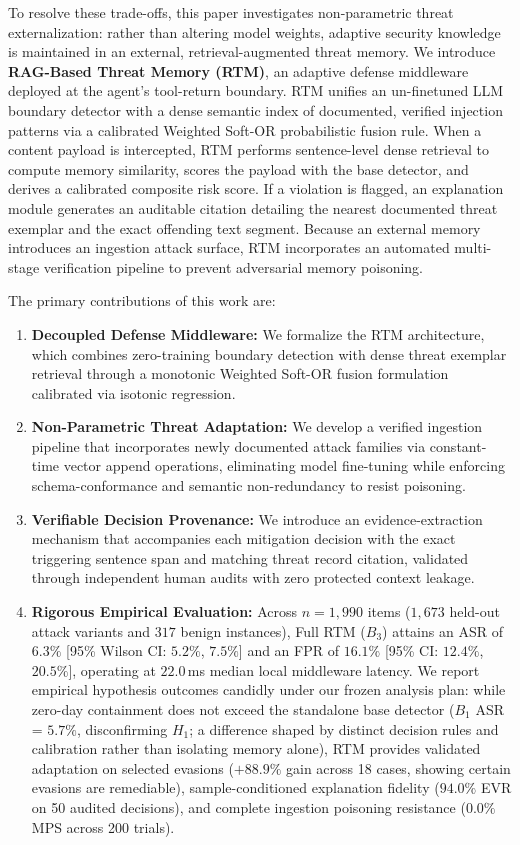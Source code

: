 \documentclass[conference]{IEEEtran}
\begin{document}
To resolve these trade-offs, this paper investigates non-parametric threat externalization: rather than altering model weights, adaptive security knowledge is maintained in an external, retrieval-augmented threat memory. We introduce \textbf{RAG-Based Threat Memory (RTM)}, an adaptive defense middleware deployed at the agent's tool-return boundary. RTM unifies an un-finetuned LLM boundary detector with a dense semantic index of documented, verified injection patterns via a calibrated Weighted Soft-OR probabilistic fusion rule. When a content payload is intercepted, RTM performs sentence-level dense retrieval to compute memory similarity, scores the payload with the base detector, and derives a calibrated composite risk score. If a violation is flagged, an explanation module generates an auditable citation detailing the nearest documented threat exemplar and the exact offending text segment. Because an external memory introduces an ingestion attack surface, RTM incorporates an automated multi-stage verification pipeline to prevent adversarial memory poisoning.

The primary contributions of this work are:
\begin{enumerate}
    \item \textbf{Decoupled Defense Middleware:} We formalize the RTM architecture, which combines zero-training boundary detection with dense threat exemplar retrieval through a monotonic Weighted Soft-OR fusion formulation calibrated via isotonic regression.
    \item \textbf{Non-Parametric Threat Adaptation:} We develop a verified ingestion pipeline that incorporates newly documented attack families via constant-time vector append operations, eliminating model fine-tuning while enforcing schema-conformance and semantic non-redundancy to resist poisoning.
    \item \textbf{Verifiable Decision Provenance:} We introduce an evidence-extraction mechanism that accompanies each mitigation decision with the exact triggering sentence span and matching threat record citation, validated through independent human audits with zero protected context leakage.
    \item \textbf{Rigorous Empirical Evaluation:} Across $n = 1,990$ items ($1,673$ held-out attack variants and $317$ benign instances), Full RTM ($B_3$) attains an ASR of $6.3\%$ [95\% Wilson CI: $5.2\%$, $7.5\%$] and an FPR of $16.1\%$ [95\% CI: $12.4\%$, $20.5\%$], operating at $22.0$\,ms median local middleware latency. We report empirical hypothesis outcomes candidly under our frozen analysis plan: while zero-day containment does not exceed the standalone base detector ($B_1$ ASR = $5.7\%$, disconfirming $H_1$; a difference shaped by distinct decision rules and calibration rather than isolating memory alone), RTM provides validated adaptation on selected evasions ($+88.9\%$ gain across 18 cases, showing certain evasions are remediable), sample-conditioned explanation fidelity ($94.0\%$ EVR on 50 audited decisions), and complete ingestion poisoning resistance ($0.0\%$ MPS across 200 trials).
\end{enumerate}
\end{document}

